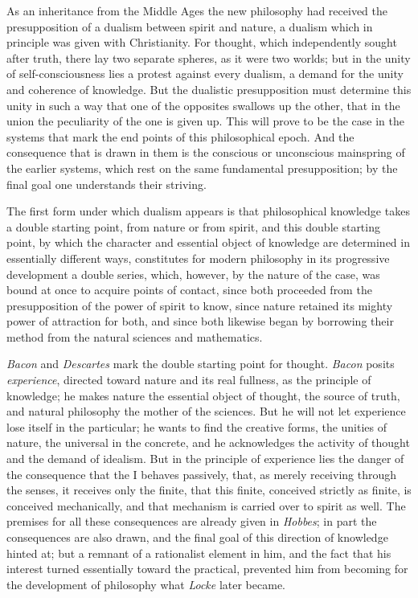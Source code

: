 \documentclass[12pt,a4paper,openany]{book}
\newcommand{\opage}[1]{\marginnote{\footnotesize\textit{[#1]}}}
\begin{document}
As an inheritance from the Middle Ages the new philosophy had received
the presupposition of a dualism between spirit and nature, a dualism
which in principle was given with Christianity. For thought, which
independently sought after truth, there lay two separate spheres, %
as it were two worlds; but in the unity of self-consciousness lies a
protest against every dualism, a demand for the unity and
\opage{7}coherence of knowledge. But the dualistic presupposition must
determine this unity in such a way that one of the opposites swallows up
the other, that in the union the peculiarity of the one is given up. This
will prove to be the case in the systems that mark the end points of
this philosophical epoch. And the consequence that is drawn in them is
the conscious or unconscious mainspring of the earlier systems, which
rest on the same fundamental presupposition; by the final goal one
understands their striving.

The first form under which dualism appears is that philosophical
knowledge takes a double starting point, from nature or from spirit, and
this double starting point, by which the character and essential object
of knowledge are determined in essentially different ways, constitutes
for modern philosophy in its progressive development a double series,
which, however, by the nature of the case, was bound at once to acquire
points of contact, since both proceeded from the presupposition of the
power of spirit to know, since nature retained its mighty power of
attraction for both, and since both likewise began by borrowing their
method from the natural sciences and mathematics.

\emph{Bacon} and \emph{Descartes} mark the double starting point for
thought. \emph{Bacon} posits \emph{experience}, directed toward nature and
its real fullness, as the principle of knowledge; he makes nature the
essential object of thought, the source of truth, and natural philosophy
the mother of the sciences. But he will not let experience lose itself in
the particular; he wants to find the creative forms, the unities of
nature, the universal in the concrete, and he acknowledges the activity
of thought and the demand of idealism. But in the principle of
experience lies the danger of the consequence that the I behaves
passively, that, as merely receiving through the senses, it receives only
the finite, that this finite, conceived strictly as finite, is conceived
mechanically, and that mechanism is carried over to spirit as well. The
premises for all these consequences are already given in \emph{Hobbes};
in part the consequences are also drawn, and the
\opage{8}final goal of this direction of knowledge hinted at; but a
remnant of a rationalist element in him, and the fact that his interest
turned essentially toward the practical, prevented him from becoming for
the development of philosophy what \emph{Locke} later became.
\end{document}
